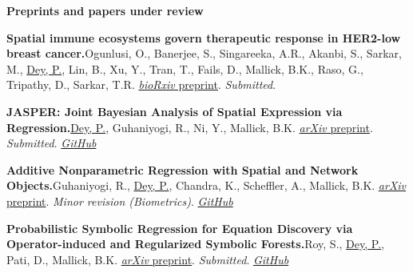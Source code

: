 \documentclass[11pt]{article}
\newcommand{\me}{\uline{Dey, P.}}
\begin{document}
\vspace{0.6em}

\textbf{\large Preprints and papers under review}
\begin{etaremune}
  \item \textbf{Spatial immune ecosystems govern therapeutic response in HER2-low breast cancer.}\quad  Ogunlusi, O., Banerjee, S., Singareeka, A.R., Akanbi, S., Sarkar, M., \me, Lin, B., Xu, Y., Tran, T., Fails, D., Mallick, B.K., Raso, G., Tripathy, D., Sarkar, T.R. \href{https://doi.org/10.64898/2026.08.19.745800}{\textit{bioRxiv} preprint}. \emph{Submitted}.
  
  \item \textbf{JASPER: Joint Bayesian Analysis of Spatial Expression via Regression.}\quad  \me, Guhaniyogi, R., Ni, Y., Mallick, B.K. \href{https://arxiv.org/abs/2604.18742}{\textit{arXiv} preprint}. \emph{Submitted}. \href{https://github.com/pritamdey/pyJASPER}{\textit{GitHub}}
  
  \item \textbf{Additive Nonparametric Regression with Spatial and Network Objects.}\quad  Guhaniyogi, R., \me, Chandra, K., Scheffler, A., Mallick, B.K. \href{https://arxiv.org/abs/2609.26867}{\textit{arXiv} preprint}. \emph{Minor revision (Biometrics)}. \href{https://github.com/pritamdey/AMOGP}{\textit{GitHub}}
  
  \item \textbf{Probabilistic Symbolic Regression for Equation Discovery via Operator-induced and Regularized Symbolic Forests.}\quad  Roy, S., \me, Pati, D., Mallick, B.K. \href{https://arxiv.org/abs/2509.19710}{\textit{arXiv} preprint}. \emph{Submitted}. \href{https://github.com/Roy-SR-007/HierBOSSS}{\textit{GitHub}}
\end{etaremune}

\vspace{0.6em}
\end{document}
